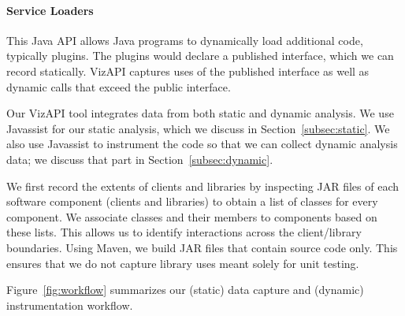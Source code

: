 \paragraph{Service Loaders} This Java API allows Java programs to dynamically load additional code, typically plugins. The plugins would declare a published interface, which we can record statically. VizAPI captures uses of the published interface as well as dynamic calls that exceed the public interface.


Our VizAPI tool integrates data from both static and dynamic analysis.
We use Javassist for our static analysis, which we discuss in Section~\ref{subsec:static}. We also use Javassist to instrument the code so that we can
collect dynamic analysis data; we discuss that part in
Section~\ref{subsec:dynamic}.

We first record the extents of clients and libraries by inspecting JAR
files of each software component (clients and libraries) to obtain a
list of classes for every component. We associate classes and their
members to components based on these lists.  This allows us to
identify interactions across the client/library boundaries. Using Maven, we build JAR
files that contain source code only. This ensures that we do not
capture library uses meant solely for unit testing. 

Figure~\ref{fig:workflow} summarizes our
(static) data capture and (dynamic) instrumentation workflow.  \\

